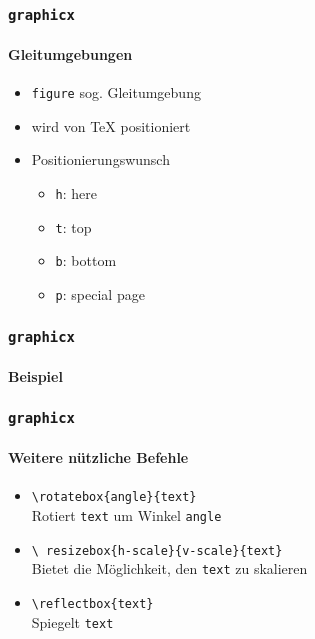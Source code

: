 \begin{frame}
  \frametitle{\texttt{graphicx}}
  \framesubtitle{Gleitumgebungen}
  \begin{itemize}
  \item \texttt{figure} sog. Gleitumgebung
  \item wird von \TeX{} positioniert
  \item Positionierungswunsch
    \begin{itemize}
    \item \texttt{h}: here
    \item \texttt{t}: top
    \item \texttt{b}: bottom
    \item \texttt{p}: special page
    \end{itemize}
  \end{itemize}
\end{frame}

\begin{frame}
  \frametitle{\texttt{graphicx}}
  \framesubtitle{Beispiel}
\end{frame}

\begin{frame}
  \frametitle{\texttt{graphicx}}
  \framesubtitle{Weitere nützliche Befehle}
  \begin{itemize}
  \item \texttt{\textbackslash rotatebox\{angle\}\{text\}}\\
    Rotiert \texttt{text} um Winkel \texttt{angle}
    \begin{center}
    \end{center}
  \item \texttt{\textbackslash
      resizebox\{h-scale\}\{v-scale\}\{text\}}\\
    Bietet die Möglichkeit, den \texttt{text} zu skalieren
    \begin{center}
    \end{center}
  \item \texttt{\textbackslash reflectbox\{text\}}\\
    Spiegelt \texttt{text}
    \begin{center}
    \end{center}
  \end{itemize}
\end{frame}

